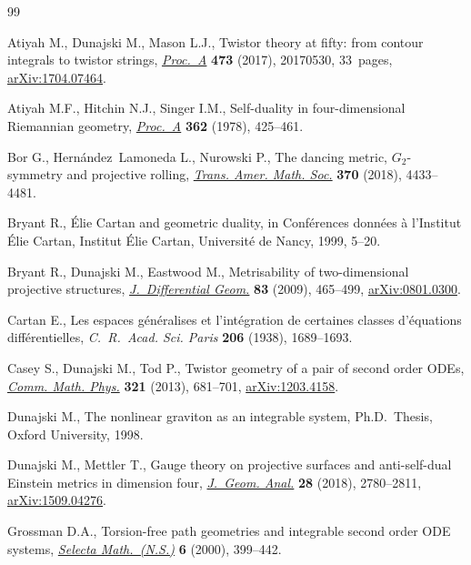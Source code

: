 \documentclass[pdftex]{sigma}%
\numberwithin{equation}{section}
\begin{document}
\begin{thebibliography}{99}
\footnotesize\itemsep=0pt

Atiyah M., Dunajski M., Mason L.J., Twistor theory at fifty: from contour
 integrals to twistor strings, \href{https://doi.org/10.1098/rspa.2017.0530}{\textit{Proc.~A}} \textbf{473} (2017), 20170530,
 33~pages, \href{https://arxiv.org/abs/1704.07464}{arXiv:1704.07464}.

Atiyah M.F., Hitchin N.J., Singer I.M., Self-duality in four-dimensional
 {R}iemannian geometry, \href{https://doi.org/10.1098/rspa.1978.0143}{\textit{Proc.~A}} \textbf{362} (1978), 425--461.

Bor G., Hern\'andez~Lamoneda L., Nurowski P., The dancing metric,
 {$G_2$}-symmetry and projective rolling, \href{https://doi.org/10.1090/tran/7277}{\textit{Trans. Amer. Math. Soc.}}
 \textbf{370} (2018), 4433--4481.

Bryant R., \'Elie Cartan and geometric duality, in Conf\'erences donn\'ees \`a
 l'Institut \'Elie Cartan, Institut \'Elie Cartan, Universit\'e de Nancy,
 1999, 5--20.

Bryant R., Dunajski M., Eastwood M., Metrisability of two-dimensional
 projective structures, \href{https://doi.org/10.4310/jdg/1264601033}{\textit{J.~Differential Geom.}} \textbf{83} (2009),
 465--499, \href{https://arxiv.org/abs/0801.0300}{arXiv:0801.0300}.

Cartan E., Les espaces g\'en\'eralises et l'int\'egration de certaines classes
 d'\'equations diff\'erentielles, \textit{C.~R.~Acad. Sci. Paris} \textbf{206}
 (1938), 1689--1693.

Casey S., Dunajski M., Tod P., Twistor geometry of a pair of second order
 {ODE}s, \href{https://doi.org/10.1007/s00220-013-1729-7}{\textit{Comm. Math. Phys.}} \textbf{321} (2013), 681--701,
 \href{https://arxiv.org/abs/1203.4158}{arXiv:1203.4158}.

Dunajski M., The nonlinear graviton as an integrable system, Ph.D.~Thesis,
 {O}xford University, 1998.

Dunajski M., Mettler T., Gauge theory on projective surfaces and anti-self-dual
 {E}instein metrics in dimension four, \href{https://doi.org/10.1007/s12220-017-9934-9}{\textit{J.~Geom. Anal.}} \textbf{28}
 (2018), 2780--2811, \href{https://arxiv.org/abs/1509.04276}{arXiv:1509.04276}.

Grossman D.A., Torsion-free path geometries and integrable second order {ODE}
 systems, \href{https://doi.org/10.1007/PL00001394}{\textit{Selecta Math.~(N.S.)}} \textbf{6} (2000), 399--442.


\end{thebibliography}
\end{document}
